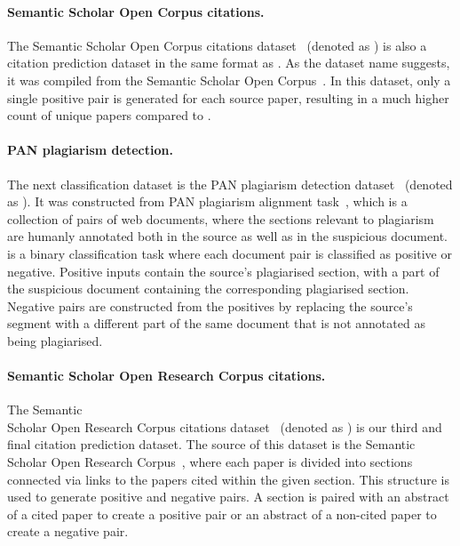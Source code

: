 \paragraph{Semantic Scholar Open Corpus citations.} The Semantic Scholar Open
Corpus citations dataset~\citep{zhou2020multilevel} (denoted as ) is
also a citation prediction dataset in the same format as . As the
dataset name suggests, it was compiled from the Semantic Scholar Open
Corpus~\citep{bhagavatula2018content}. In this dataset, only a single positive
pair is generated for each source paper, resulting in a much higher count of
unique papers compared to .

\paragraph{PAN plagiarism detection.} The next classification dataset is the
PAN plagiarism detection dataset~\citep{zhou2020multilevel} (denoted as
). It was constructed from PAN plagiarism alignment
task~\citep{potthast2013overview}, which is a collection of pairs of web
documents, where the sections relevant to plagiarism are humanly annotated both
in the source as well as in the suspicious document.  is a binary
classification task where each document pair is classified as positive or
negative. Positive inputs contain the source's plagiarised section, with a part
of the suspicious document containing the corresponding plagiarised section.
Negative pairs are constructed from the positives by replacing the source's
segment with a different part of the same document that is not annotated as
being plagiarised.

\paragraph{Semantic Scholar Open Research Corpus citations.} The Semantic \\
Scholar Open Research Corpus citations dataset~\citep{zhou2020multilevel}
(denoted as ) is our third and final citation prediction dataset.
The source of this dataset is the Semantic Scholar Open Research
Corpus~\citep{lo2019s2orc}, where each paper is divided into sections connected
via links to the papers cited within the given section. This structure is used
to generate positive and negative pairs. A section is paired with an abstract
of a cited paper to create a positive pair or an abstract of a non-cited paper
to create a negative pair.


